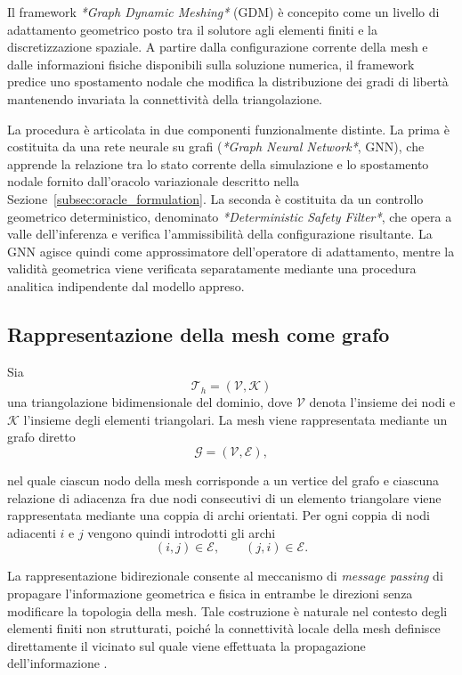 Il framework \textit{*Graph Dynamic Meshing*} (GDM) è concepito come un livello di adattamento geometrico posto tra il solutore agli elementi finiti e la discretizzazione spaziale. A partire dalla configurazione corrente della mesh e dalle informazioni fisiche disponibili sulla soluzione numerica, il framework predice uno spostamento nodale che modifica la distribuzione dei gradi di libertà mantenendo invariata la connettività della triangolazione.

La procedura è articolata in due componenti funzionalmente distinte. La prima è costituita da una rete neurale su grafi (\textit{*Graph Neural Network*}, GNN), che apprende la relazione tra lo stato corrente della simulazione e lo spostamento nodale fornito dall'oracolo variazionale descritto nella Sezione~\ref{subsec:oracle_formulation}. La seconda è costituita da un controllo geometrico deterministico, denominato \textit{*Deterministic Safety Filter*}, che opera a valle dell'inferenza e verifica l'ammissibilità della configurazione risultante. La GNN agisce quindi come approssimatore dell'operatore di adattamento, mentre la validità geometrica viene verificata separatamente mediante una procedura analitica indipendente dal modello appreso.

\subsection{Rappresentazione della mesh come grafo}
\label{subsec:graph_representation}

Sia
\[
\mathcal{T}_h=(\mathcal{V},\mathcal{K})
\]
una triangolazione bidimensionale del dominio, dove $\mathcal{V}$ denota l'insieme dei nodi e $\mathcal{K}$ l'insieme degli elementi triangolari. La mesh viene rappresentata mediante un grafo diretto
\begin{equation}
\mathcal{G}=(\mathcal{V},\mathcal{E}),
\label{eq:graph_definition}
\end{equation}

nel quale ciascun nodo della mesh corrisponde a un vertice del grafo e ciascuna relazione di adiacenza fra due nodi consecutivi di un elemento triangolare viene rappresentata mediante una coppia di archi orientati. Per ogni coppia di nodi adiacenti $i$ e $j$ vengono quindi introdotti gli archi
\[
(i,j)\in\mathcal{E},
\qquad
(j,i)\in\mathcal{E}.
\]

La rappresentazione bidirezionale consente al meccanismo di \textit{message passing} di propagare l'informazione geometrica e fisica in entrambe le direzioni senza modificare la topologia della mesh. Tale costruzione è naturale nel contesto degli elementi finiti non strutturati, poiché la connettività locale della mesh definisce direttamente il vicinato sul quale viene effettuata la propagazione dell'informazione \citep{battaglia2018relational,bronstein2021geometric}.

